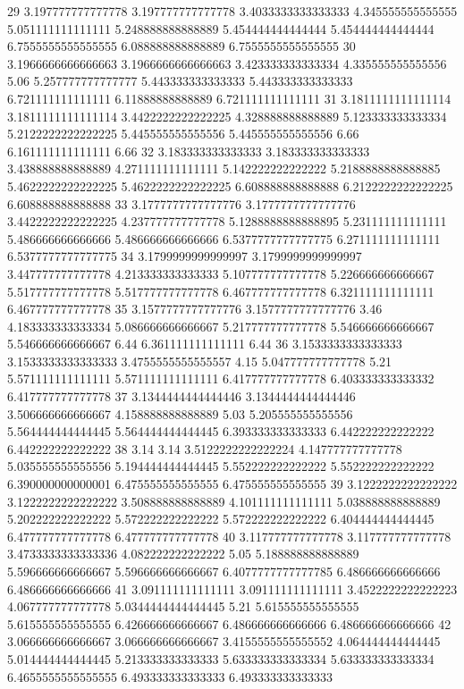 29 3.197777777777778 3.197777777777778 3.4033333333333333 4.345555555555555 5.051111111111111 5.248888888888889 5.454444444444444 5.454444444444444 6.7555555555555555 6.088888888888889 6.7555555555555555
30 3.1966666666666663 3.1966666666666663 3.423333333333334 4.335555555555556 5.06 5.257777777777777 5.443333333333333 5.443333333333333 6.721111111111111 6.11888888888889 6.721111111111111
31 3.1811111111111114 3.1811111111111114 3.4422222222222225 4.328888888888889 5.123333333333334 5.2122222222222225 5.445555555555556 5.445555555555556 6.66 6.161111111111111 6.66
32 3.183333333333333 3.183333333333333 3.438888888888889 4.271111111111111 5.142222222222222 5.2188888888888885 5.4622222222222225 5.4622222222222225 6.608888888888888 6.2122222222222225 6.608888888888888
33 3.1777777777777776 3.1777777777777776 3.4422222222222225 4.237777777777778 5.1288888888888895 5.231111111111111 5.486666666666666 5.486666666666666 6.5377777777777775 6.271111111111111 6.5377777777777775
34 3.1799999999999997 3.1799999999999997 3.447777777777778 4.213333333333333 5.107777777777778 5.226666666666667 5.517777777777778 5.517777777777778 6.467777777777778 6.321111111111111 6.467777777777778
35 3.1577777777777776 3.1577777777777776 3.46 4.183333333333334 5.086666666666667 5.217777777777778 5.546666666666667 5.546666666666667 6.44 6.361111111111111 6.44
36 3.1533333333333333 3.1533333333333333 3.4755555555555557 4.15 5.047777777777778 5.21 5.571111111111111 5.571111111111111 6.417777777777778 6.403333333333332 6.417777777777778
37 3.1344444444444446 3.1344444444444446 3.506666666666667 4.158888888888889 5.03 5.205555555555556 5.564444444444445 5.564444444444445 6.393333333333333 6.442222222222222 6.442222222222222
38 3.14 3.14 3.5122222222222224 4.147777777777778 5.035555555555556 5.194444444444445 5.552222222222222 5.552222222222222 6.390000000000001 6.475555555555555 6.475555555555555
39 3.1222222222222222 3.1222222222222222 3.508888888888889 4.101111111111111 5.038888888888889 5.202222222222222 5.572222222222222 5.572222222222222 6.404444444444445 6.477777777777778 6.477777777777778
40 3.117777777777778 3.117777777777778 3.4733333333333336 4.082222222222222 5.05 5.188888888888889 5.596666666666667 5.596666666666667 6.4077777777777785 6.486666666666666 6.486666666666666
41 3.091111111111111 3.091111111111111 3.4522222222222223 4.067777777777778 5.0344444444444445 5.21 5.615555555555555 5.615555555555555 6.426666666666667 6.486666666666666 6.486666666666666
42 3.066666666666667 3.066666666666667 3.4155555555555552 4.064444444444445 5.014444444444445 5.213333333333333 5.633333333333334 5.633333333333334 6.4655555555555555 6.493333333333333 6.493333333333333
